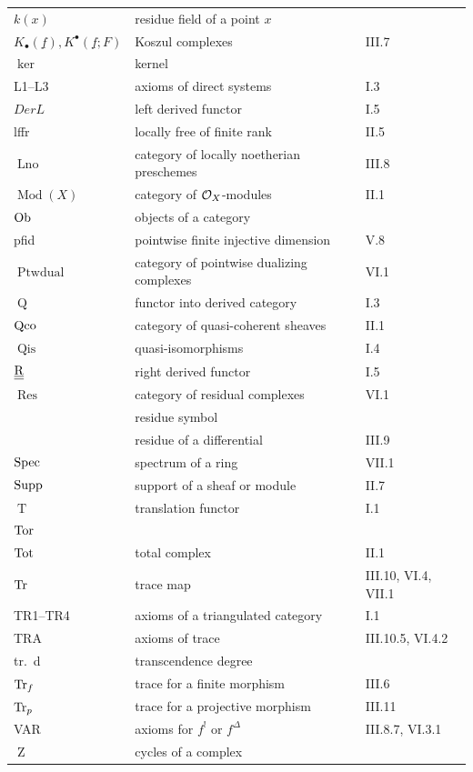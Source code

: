 \begin{longtable}{@{}l p{8cm} l@{}}
	$k(x)$ & residue field of a point $x$ & \\
	$K_\bullet(\underline{f}),K^\bullet(\underline{f};F)$ & Koszul complexes & III.7 \\
	$\ker$ & kernel & \\
	L1--L3 & axioms of direct systems & I.3 \\
	$DerL$ & left derived functor & I.5 \\
	lffr & locally free of finite rank & II.5 \\
	$\operatorname{Lno}$ & category of locally noetherian preschemes & III.8 \\
	$\operatorname{Mod}(X)$ & category of $\mathcal{O}_X$-modules & II.1 \\
	$\operatorname{Ob}$ & objects of a category & \\
	pfid & pointwise finite injective dimension & V.8 \\
	$\operatorname{Ptwdual}$ & category of pointwise dualizing complexes & VI.1 \\
	$\operatorname{Q}$ & functor into derived category & I.3 \\
	$\operatorname{Qco}$ & category of quasi-coherent sheaves & II.1 \\
	$\operatorname{Qis}$ & quasi-isomorphisms & I.4 \\
	$\underline{\underline{\operatorname{R}}}$ & right derived functor & I.5 \\
	$\operatorname{Res}$ & category of residual complexes & VI.1 \\
	&  residue symbol & \\
	&  residue of a differential & III.9 \\
	$\operatorname{Spec}$ & spectrum of a ring & VII.1 \\
	$\operatorname{Supp}$ & support of a sheaf or module & II.7 \\
	$\operatorname{T}$ & translation functor & I.1 \\
	$\operatorname{Tor}$ &  &  \\
	$\operatorname{Tot}$ & total complex & II.1 \\
	$\operatorname{Tr}$ & trace map & III.10, VI.4, VII.1 \\
	TR1--TR4 & axioms of a triangulated category & I.1 \\
	TRA & axioms of trace & III.10.5, VI.4.2 \\
	tr.\ d & transcendence degree & \\
	$\operatorname{Tr}_f$ & trace for a finite morphism & III.6 \\
	$\operatorname{Tr}_p$ & trace for a projective morphism & III.11 \\
	VAR & axioms for $f^!$ or $f^\Delta$ & III.8.7, VI.3.1 \\
	$\operatorname{Z}$ & cycles of a complex & \\
\end{longtable}

